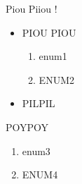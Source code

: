 
Piou Piiou !
\begin{itemize}
\item PIOU PIOU
\begin{enumerate}
\item enum1
\item ENUM2
\end{enumerate}
\item PILPIL
\end{itemize}
POYPOY

\begin{enumerate}
\item enum3
\item ENUM4
\end{enumerate}

